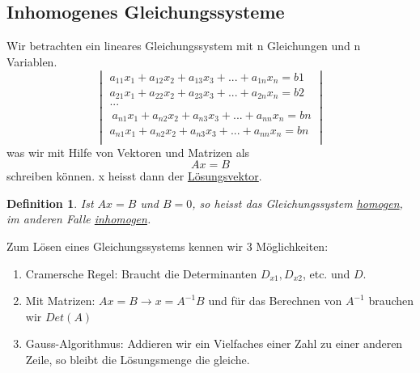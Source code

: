 \documentclass[a4paper,10pt]{report}
\newtheorem{mydef}{Definition}
\begin{document}
\subsection{Inhomogenes Gleichungssysteme}
Wir betrachten ein lineares Gleichungssystem mit n Gleichungen und n Variablen.
\begin{equation*}
\begin{vmatrix}
a_{11}x_1+a_{12}x_2+a_{13}x_3 + ... + a_{1n}x_n = b1\\
a_{21}x_1+a_{22}x_2+a_{23}x_3 + ... + a_{2n}x_n = b2\\
...\\\
a_{n1}x_1+a_{n2}x_2+a_{n3}x_3 + ... + a_{nn}x_n = bn\\
a_{n1}x_1+a_{n2}x_2+a_{n3}x_3 + ... + a_{nn}x_n = bn\\
\end{vmatrix}
\end{equation*}
was wir mit Hilfe von Vektoren und Matrizen als
\begin{equation*}
Ax = B
\end{equation*}
schreiben können. x heisst dann der \underline{Lösungsvektor}.
\begin{mydef}
Ist $Ax=B$ und $B=0$, so heisst das Gleichungssystem \underline{homogen}, im anderen Falle \underline{inhomogen}.
\end{mydef}
Zum Lösen eines Gleichungssystems kennen wir 3 Möglichkeiten:
\begin{enumerate}
	\item Cramersche Regel: Braucht die Determinanten $D_{x1}, D_{x2}$, etc. und $D$.
	\item Mit Matrizen: $Ax=B \to x = A^{-1}B$ und für das Berechnen von $A^{-1}$ brauchen wir $Det(A)$
	\item Gauss-Algorithmus: Addieren wir ein Vielfaches einer Zahl zu einer anderen Zeile, so bleibt die Lösungsmenge die gleiche.
\end{enumerate}
\newpage
\end{document}
